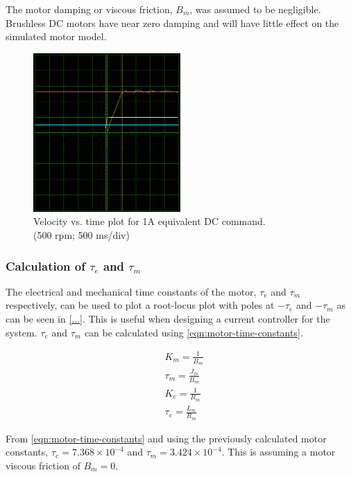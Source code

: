 The motor damping or viscous friction, $B_m$, was assumed to be negligible. Brushless DC motors have near zero damping and will have little effect on the simulated motor model.

\begin{figure}
\centering
\includegraphics[width=0.5\textwidth]{images/driveware/current-velocity-response} 
\caption{Velocity vs. time plot for 1A equivalent DC command.\\
(500 rpm; 500 ms/div)}
\label{fig:jm-plots}
\end{figure}

\subsubsection{Calculation of $\tau_e$ and $\tau_m$}
The electrical and mechanical time constants of the motor, $\tau_e$ and $\tau_m$ respectively, can be used to plot a root-locus plot with poles at $-\tau_e$ and $-\tau_m$ as can be seen in \cref{...}. This is useful when designing a current controller for the system. $\tau_e$ and $\tau_m$ can be calculated using \cref{eqn:motor-time-constants}.

\begin{equation} \label{eqn:motor-time-constants}
\begin{aligned}
&K_m = \frac{1}{B_m} \\
&\tau_m = \frac{J_m}{B_m} \\
&K_e = \frac{1}{R_m} \\
&\tau_e = \frac{L_m}{R_m} 
\end{aligned}
\end{equation}

From \cref{eqn:motor-time-constants} and using the previously calculated motor constants, $\tau_e = 7.368 \times 10^{-4}$ and $\tau_m = 3.424 \times 10^{-4}$. This is assuming a motor viscous friction of $B_m = 0$.

